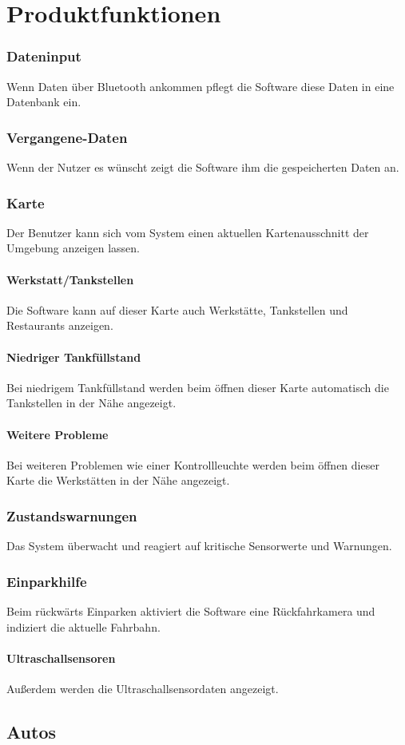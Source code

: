 \documentclass[pflichtenheft.tex]{subfiles}
\begin{document}
\chapter{Produktfunktionen}
\subsection{\mkfa Dateninput}
Wenn Daten über Bluetooth ankommen pflegt die Software diese Daten in eine Datenbank ein. 
\subsection{\mkfa Vergangene-Daten}
Wenn der Nutzer es wünscht zeigt die Software ihm die gespeicherten Daten an.
\subsection{\mkfa Karte}
Der Benutzer kann sich vom System einen aktuellen Kartenausschnitt der Umgebung anzeigen lassen.
\subsubsection{\mkfa Werkstatt/Tankstellen}
Die Software kann auf dieser Karte auch Werkstätte, Tankstellen und Restaurants anzeigen.
\subsubsection{\mkfa Niedriger Tankfüllstand}
Bei niedrigem Tankfüllstand werden beim öffnen dieser Karte automatisch die Tankstellen in der Nähe angezeigt.
\subsubsection{\mkfa Weitere Probleme} %
Bei weiteren Problemen wie einer Kontrollleuchte werden beim öffnen dieser Karte die Werkstätten in der Nähe angezeigt.
\subsection{\mkfa Zustandswarnungen}
Das System überwacht und reagiert auf kritische Sensorwerte und Warnungen.
\subsection{\mkfa Einparkhilfe}
Beim rückwärts Einparken aktiviert die Software eine Rückfahrkamera und indiziert die aktuelle Fahrbahn.
\subsubsection{\mkfa Ultraschallsensoren}
Außerdem werden die Ultraschallsensordaten angezeigt.
\section{Autos}
\end{document}
